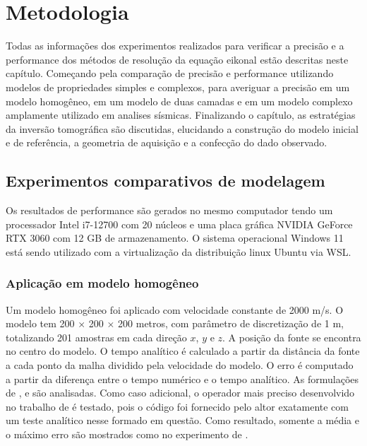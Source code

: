 \chapter{Metodologia}
\label{ch:metodologia}

Todas as informações dos experimentos realizados para verificar a precisão e a performance dos métodos de resolução da equação eikonal estão descritas neste capítulo. Começando pela comparação de precisão e performance utilizando modelos de propriedades simples e complexos, para averiguar a precisão em um modelo homogêneo, em um modelo de duas camadas e em um modelo complexo amplamente utilizado em analises sísmicas. Finalizando o capítulo, as estratégias da inversão tomográfica são discutidas, elucidando a construção do modelo inicial e de referência, a geometria de aquisição e a confecção do dado observado.

\section{Experimentos comparativos de modelagem}

Os resultados de performance são gerados no mesmo computador tendo um processador Intel i7-12700 com 20 núcleos e uma placa gráfica NVIDIA GeForce RTX 3060 com 12 GB de armazenamento. O sistema operacional Windows 11 está sendo utilizado com a virtualização da distribuição linux Ubuntu via WSL.  

\subsection*{Aplicação em modelo homogêneo}

Um modelo homogêneo foi aplicado com velocidade constante de 2000 m/s. O modelo tem 200 $\times$ 200 $\times$ 200 metros, com parâmetro de discretização de 1 m, totalizando 201 amostras em cada direção $x$, $y$ e $z$. A posição da fonte se encontra no centro do modelo. O tempo analítico é calculado a partir da distância da fonte a cada ponto da malha dividido pela velocidade do modelo. O erro é computado a partir da diferença entre o tempo numérico e o tempo analítico. As formulações de ,  e  são analisadas. Como caso adicional, o operador mais preciso desenvolvido no trabalho de  é testado, pois o código foi fornecido pelo altor exatamente com um teste analítico nesse formado em questão. Como resultado, somente a média e o máximo erro são mostrados como no experimento de . 

